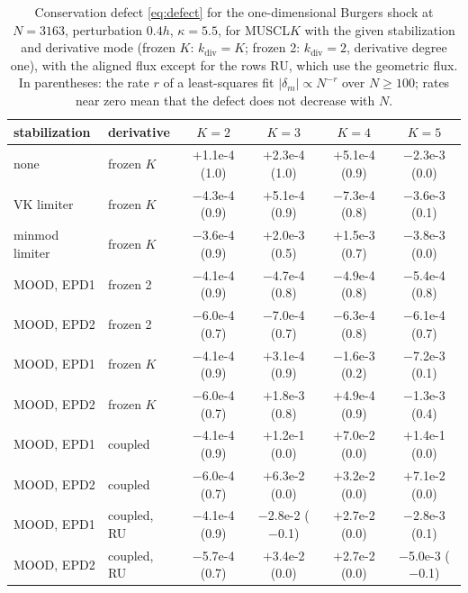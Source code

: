 \documentclass[11pt,a4paper]{article}
\numberwithin{equation}{section}
\begin{document}
\begin{table}[!htbp]
\centering
\caption{Conservation defect \eqref{eq:defect} for the one-dimensional Burgers shock at $N=3163$, perturbation $0.4h$, $\kappa=5.5$, for MUSCL$K$ with the given stabilization and derivative mode (frozen $K$: $k_{\mathrm{div}}=K$; frozen 2: $k_{\mathrm{div}}=2$, derivative degree one), with the aligned flux except for the rows RU, which use the geometric flux. In parentheses: the rate $r$ of a least-squares fit $|\delta_m|\propto N^{-r}$ over $N\ge100$; rates near zero mean that the defect does not decrease with $N$.}\label{tab:mass_shock}
\footnotesize
\setlength{\tabcolsep}{4pt}
\begin{tabular}{llcccc}
\toprule
stabilization & derivative & $K=2$ & $K=3$ & $K=4$ & $K=5$\\
\midrule
none & frozen $K$ & $+$1.1e-4 (1.0) & $+$2.3e-4 (1.0) & $+$5.1e-4 (0.9) & $-$2.3e-3 (0.0)\\
VK limiter & frozen $K$ & $-$4.3e-4 (0.9) & $+$5.1e-4 (0.9) & $-$7.3e-4 (0.8) & $-$3.6e-3 (0.1)\\
minmod limiter & frozen $K$ & $-$3.6e-4 (0.9) & $+$2.0e-3 (0.5) & $+$1.5e-3 (0.7) & $-$3.8e-3 (0.0)\\
\midrule
MOOD, EPD1 & frozen 2 & $-$4.1e-4 (0.9) & $-$4.7e-4 (0.8) & $-$4.9e-4 (0.8) & $-$5.4e-4 (0.8)\\
MOOD, EPD2 & frozen 2 & $-$6.0e-4 (0.7) & $-$7.0e-4 (0.7) & $-$6.3e-4 (0.8) & $-$6.1e-4 (0.7)\\
MOOD, EPD1 & frozen $K$ & $-$4.1e-4 (0.9) & $+$3.1e-4 (0.9) & $-$1.6e-3 (0.2) & $-$7.2e-3 (0.1)\\
MOOD, EPD2 & frozen $K$ & $-$6.0e-4 (0.7) & $+$1.8e-3 (0.8) & $+$4.9e-4 (0.9) & $-$1.3e-3 (0.4)\\
\midrule
MOOD, EPD1 & coupled & $-$4.1e-4 (0.9) & $+$1.2e-1 (0.0) & $+$7.0e-2 (0.0) & $+$1.4e-1 (0.0)\\
MOOD, EPD2 & coupled & $-$6.0e-4 (0.7) & $+$6.3e-2 (0.0) & $+$3.2e-2 (0.0) & $+$7.1e-2 (0.0)\\
MOOD, EPD1 & coupled, RU & $-$4.1e-4 (0.9) & $-$2.8e-2 ($-$0.1) & $+$2.7e-2 (0.0) & $-$2.8e-3 (0.1)\\
MOOD, EPD2 & coupled, RU & $-$5.7e-4 (0.7) & $+$3.4e-2 (0.0) & $+$2.7e-2 (0.0) & $-$5.0e-3 ($-$0.1)\\
\bottomrule
\end{tabular}
\end{table}
\end{document}
